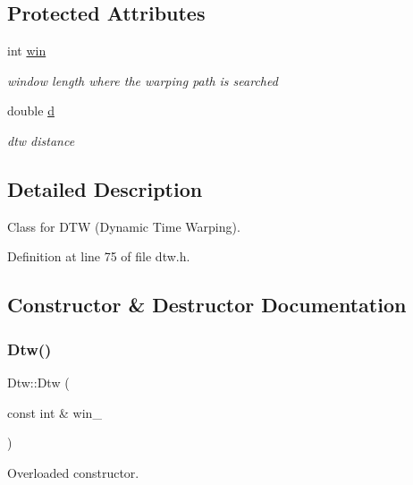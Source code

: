 \subsection*{Protected Attributes}
\begin{DoxyCompactItemize}
\item 
\mbox{\label{classassistive__rehab_1_1Dtw_a136ae6493254529accbdcf73cdce4ce6}} 
int \hyperlink{classassistive__rehab_1_1Dtw_a136ae6493254529accbdcf73cdce4ce6}{win}
\begin{DoxyCompactList}\small\item\em window length where the warping path is searched \end{DoxyCompactList}\item 
\mbox{\label{classassistive__rehab_1_1Dtw_a2931d56d23435f12a7697dde5ec605ed}} 
double \hyperlink{classassistive__rehab_1_1Dtw_a2931d56d23435f12a7697dde5ec605ed}{d}
\begin{DoxyCompactList}\small\item\em dtw distance \end{DoxyCompactList}\end{DoxyCompactItemize}


\subsection{Detailed Description}
Class for D\+TW (Dynamic Time Warping). 

Definition at line 75 of file dtw.\+h.



\subsection{Constructor \& Destructor Documentation}
\mbox{\label{classassistive__rehab_1_1Dtw_adb11d58b5482f14ade22f5f630a24843}} 
\subsubsection{\texorpdfstring{Dtw()}{Dtw()}}
{\footnotesize\ttfamily Dtw\+::\+Dtw (\begin{DoxyParamCaption}\item[{const int \&}]{win\+\_\+ }\end{DoxyParamCaption})}



Overloaded constructor. 



